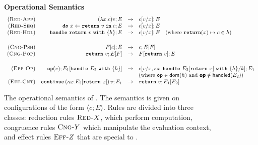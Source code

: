 \begin{figure}[ht]
\begin{eff-desc}
{\noindent\textbf{Operational Semantics}}
  {\footnotesize
\[
  \begin{array}{rrcl}
  \reductionRule{App} & \transition{\effconfiguration{(\function{x}{c})v}{E}}{\effconfiguration{c[v/x]}{E}}\\
  \reductionRule{Seq} & \transition{\effconfiguration{\bind{x}{\return{v}}{c}}{E}}{\effconfiguration{c[v/x]}{E}}\\
  \reductionRule{Hdl} & \transition{\effconfiguration{\handleWith{\return{v}}{h}}{E}}{\effconfiguration{c[v/x]}{E}} \quad (\text{where $\returnHandler{x}{c} \in h$)}\\
  \vspace{1mm} \\ 
  \congruenceRule{Psh} & \transition{\effconfiguration{F[c]}{E}}{\effconfiguration{c}{E[F]}} \\
  \congruenceRule{Pop} & \transition{\effconfiguration{\return{v}}{E[F]}}{\effconfiguration{F[\return{v}]}{E}}\\
  \vspace{1mm} \\
  \effectRule{Op} & \transition{\effconfiguration{\op{v}}{E_1[\handleWith{E_2}{h}]}}\effconfiguration{c[v/x, \kappa x. \, \handleWith{E_2[\return{x}]}{h} / k]}{E_1}\\
  &&& \text{(where $\textbf{\texttt{op}} \in \textsf{dom}(h)$ and $\textbf{\textsf{op}} \notin \textsf{handled}(E_2)$)}\\
  \effectRule{Cnt} & \transition{\effconfiguration{\continue{(\kappa x. E_2[\return{x}])}{v}}{E_1}}{\effconfiguration{\return{v}}{E_1[E_2]}}

\end{array}
\]
  }
\end{eff-desc}
\caption{The operational semantics of \efflang. The semantics is given on configurations of the form $\langle c; E \rangle$. Rules are divided into three classes: reduction rules $\textsc{Red-}X$, which perform computation, congruence rules $\textsc{Cng-}Y$ which manipulate the evaluation context, and effect rules $\textsc{Eff-}Z$ that are special to \efflang{}.}
\label{fig:efflang-opsem}
\end{figure}

